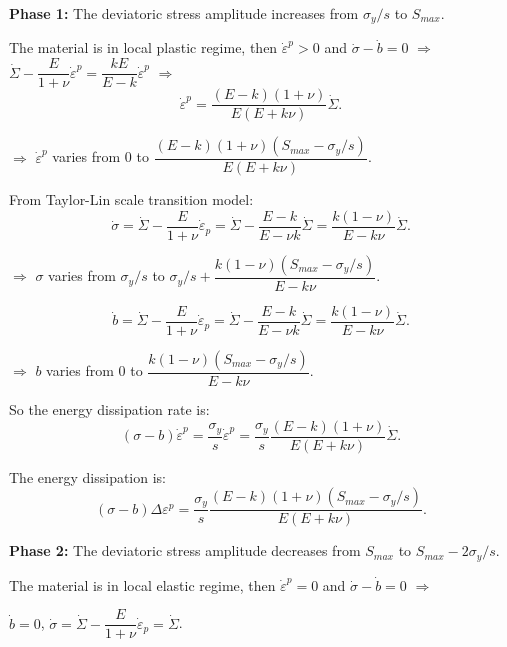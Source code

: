 \documentclass[3p,times,procedia,number]{elsarticle}
\begin{document}
\noindent
\textbf{Phase 1:} The deviatoric stress amplitude increases from $\sigma_y/s$ to $S_{max}$.

\noindent
The material is in local plastic regime, then $\dot{\varepsilon}^p>0$ and $\dot{\sigma}-\dot{b}=0$ $\Rightarrow$ $\dot{\Sigma}-\dfrac{E}{1+\nu}\dot{\varepsilon}^p=\dfrac{kE}{E-k}\dot{\varepsilon}^p$ $\Rightarrow$ 
$$\dot{\varepsilon}^p=\dfrac{(E- k)(1+\nu)}{E(E+k\nu)}\dot{\Sigma}.$$

\vspace{6pt}
\noindent
$\Rightarrow$ $\dot{\varepsilon}^p$ varies from 0 to $\dfrac{(E- k)(1+\nu)(S_{max}-\sigma_y/s)}{E(E+k\nu)}$.

\vspace{6pt}
\noindent
From Taylor-Lin scale transition model:
$$\dot{\sigma}=\dot{\Sigma}-\dfrac{E}{1+\nu}\dot{\varepsilon}_p=\dot{\Sigma}-\dfrac{E-k}{E-\nu k}\dot{\Sigma}=\dfrac{k(1-\nu)}{E-k\nu}\dot{\Sigma}.$$

\vspace{6pt}
\noindent
$\Rightarrow$ $\sigma$ varies from $\sigma_y/s$ to $\sigma_y/s+\dfrac{k(1-\nu)(S_{max}-\sigma_y/s)}{E-k\nu}$.

\vspace{6pt}
$$\dot{b}=\dot{\Sigma}-\dfrac{E}{1+\nu}\dot{\varepsilon}_p=\dot{\Sigma}-\dfrac{E-k}{E-\nu k}\dot{\Sigma}=\dfrac{k(1-\nu)}{E-k\nu}\dot{\Sigma}.$$

\vspace{6pt}
\noindent
$\Rightarrow$ $b$ varies from $0$ to $\dfrac{k(1-\nu)(S_{max}-\sigma_y/s)}{E-k\nu}$.

\vspace{6pt}
\noindent
So the energy dissipation rate is: $$(\sigma-b)\dot{\varepsilon}^p=\dfrac{\sigma_y}{s}\dot{\varepsilon}^p=\dfrac{\sigma_y}{s}\dfrac{(E- k)(1+\nu)}{E(E+k\nu)}\dot{\Sigma}.$$

\noindent
The energy dissipation is: $$(\sigma-b)\Delta\varepsilon^p=\dfrac{\sigma_y}{s}\dfrac{(E- k)(1+\nu)(S_{max}-\sigma_y/s)}{E(E+k\nu)}.$$

\vspace{6pt}
\noindent
\textbf{Phase 2:} The deviatoric stress amplitude decreases from $S_{max}$ to $S_{max}-2\sigma_y/s$.

\noindent
The material is in local elastic regime, then $\dot{\varepsilon}^p=0$ and $\dot{\sigma}-\dot{b}=0$ $\Rightarrow$

\vspace{6pt}
\noindent
$\dot{b}=0$, $\dot{\sigma}=\dot{\Sigma}-\dfrac{E}{1+\nu}\dot{\varepsilon}_p=\dot{\Sigma}$.
\end{document}
